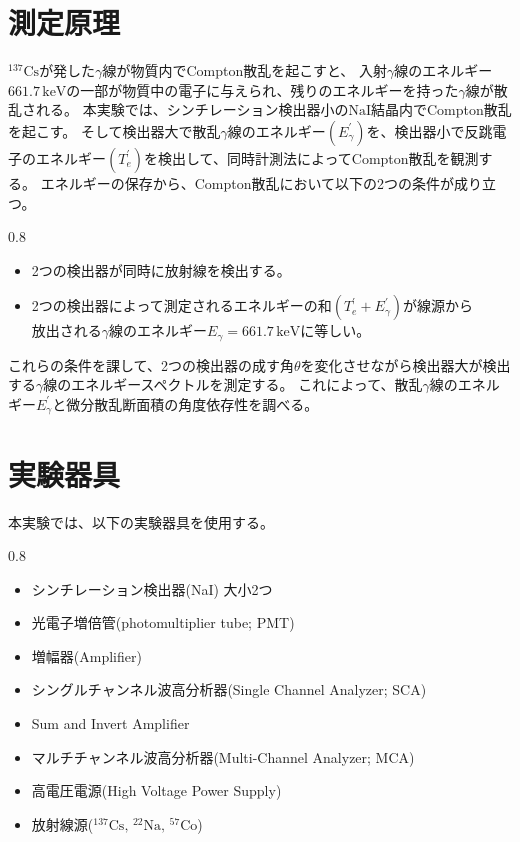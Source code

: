\documentclass[11pt, titlepage, openany]{ltjsbook}
\begin{document}
\section{測定原理}
$^{137}\mathrm{Cs}$が発した$\gamma$線が物質内でCompton散乱を起こすと、
入射$\gamma$線のエネルギー$661.7\,\mathrm{keV}$の一部が物質中の電子に与えられ、残りのエネルギーを持った$\gamma$線が散乱される。
本実験では、シンチレーション検出器小の$\mathrm{NaI}$結晶内でCompton散乱を起こす。
そして検出器大で散乱$\gamma$線のエネルギー$(E^{\prime}_{\gamma})$を、検出器小で反跳電子のエネルギー$(T^{\prime}_e)$を検出して、同時計測法によってCompton散乱を観測する。
エネルギーの保存から、Compton散乱において以下の2つの条件が成り立つ。
\begin{center}
    \begin{varwidth}{0.8\textwidth}
        \begin{itemize}
            \item[\textbf{条件1：}] 2つの検出器が同時に放射線を検出する。
            \item[\textbf{条件2：}] 2つの検出器によって測定されるエネルギーの和$(T^{\prime}_e + E^{\prime}_{\gamma})$が線源から\\
                                  放出される$\gamma$線のエネルギー$E_{\gamma}=661.7\,\mathrm{keV}$に等しい。
        \end{itemize}
    \end{varwidth}
\end{center}
これらの条件を課して、2つの検出器の成す角$\theta$を変化させながら検出器大が検出する$\gamma$線のエネルギースペクトルを測定する。
これによって、散乱$\gamma$線のエネルギー$E^{\prime}_{\gamma}$と微分散乱断面積の角度依存性を調べる。
\section{実験器具}
本実験では、以下の実験器具を使用する。
\begin{center}
    \begin{varwidth}{0.8\textwidth}
        \begin{itemize}
            \item シンチレーション検出器(NaI) 大小2つ
            \item 光電子増倍管(photomultiplier tube; PMT)
            \item 増幅器(Amplifier)
            \item シングルチャンネル波高分析器(Single Channel Analyzer; SCA)
            \item Sum and Invert Amplifier
            \item マルチチャンネル波高分析器(Multi-Channel Analyzer; MCA)
            \item 高電圧電源(High Voltage Power Supply)
            \item 放射線源($\mathrm{^{137}Cs,\,^{22}Na,\,^{57}Co}$)
        \end{itemize}
    \end{varwidth}
\end{center}
\end{document}
